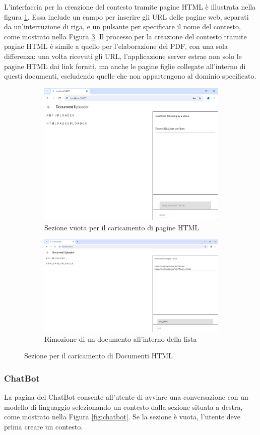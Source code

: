 L'interfaccia per la creazione del contesto tramite pagine HTML è illustrata nella figura \ref{fig:html_section}. Essa include un campo per inserire gli URL delle pagine web, separati da un'interruzione di riga, e un pulsante per specificare il nome del contesto, come mostrato nella Figura \ref{fig:html_upload}.
Il processo per la creazione del contesto tramite pagine HTML è simile a quello per l'elaborazione dei PDF, con una sola differenza: una volta ricevuti gli URL, l'applicazione server estrae non solo le pagine HTML dai link forniti, ma anche le pagine figlie collegate all'interno di questi documenti, escludendo quelle che non appartengono al dominio specificato.

\begin{figure}[H]
	\centering
        \begin{subfigure}{.5\textwidth}
		\centering
		\includegraphics[width=0.45\linewidth]{Immagini/html_uploader_page.png}
		\caption{Sezione vuota per il caricamento di pagine HTML\newline}
		\label{fig:html_section}
	\end{subfigure}%
        \begin{subfigure}{.5\textwidth}
		\centering
		\includegraphics[width=0.45\linewidth]{Immagini/html_uploads.png}
		\caption{Rimozione di un documento all'interno della lista\newline}
		\label{fig:html_upload}
	\end{subfigure}%
	\caption{Sezione per il caricamento di Documenti HTML}
\end{figure}

\subsubsection{ChatBot}
La pagina del ChatBot consente all'utente di avviare una conversazione con un modello di linguaggio selezionando un contesto dalla sezione situata a destra, come mostrato nella Figura \ref{fig:chatbot}. Se la sezione è vuota, l'utente deve prima creare un contesto.

